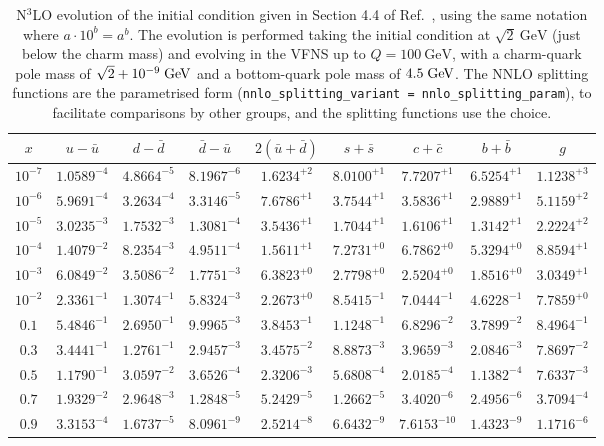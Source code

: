 \begin{table}[p]
  \small \centering
  \begin{tabular}{c|cccccccc}
    $x$ &  $u-\bar u$ &$d-\bar d$ &$\bar d-\bar u$ &  $ 2(\bar u+\bar d)$  &$s+\bar s$&$c+\bar c$ &$b+\bar b$  &   $g$\\
    \toprule
$10^{-7}$ &  $1.0589^{-4}$ &  $4.8664^{-5}$ &  $8.1967^{-6}$ &  $1.6234^{+2}$ &  $8.0100^{+1}$ &  $7.7207^{+1}$ &  $6.5254^{+1}$ &  $1.1238^{+3}$ \\
$10^{-6}$ &  $5.9691^{-4}$ &  $3.2634^{-4}$ &  $3.3146^{-5}$ &  $7.6786^{+1}$ &  $3.7544^{+1}$ &  $3.5836^{+1}$ &  $2.9889^{+1}$ &  $5.1159^{+2}$ \\
$10^{-5}$ &  $3.0235^{-3}$ &  $1.7532^{-3}$ &  $1.3081^{-4}$ &  $3.5436^{+1}$ &  $1.7044^{+1}$ &  $1.6106^{+1}$ &  $1.3142^{+1}$ &  $2.2224^{+2}$ \\
$10^{-4}$ &  $1.4079^{-2}$ &  $8.2354^{-3}$ &  $4.9511^{-4}$ &  $1.5611^{+1}$ &  $7.2731^{+0}$ &  $6.7862^{+0}$ &  $5.3294^{+0}$ &  $8.8594^{+1}$ \\
$10^{-3}$ &  $6.0849^{-2}$ &  $3.5086^{-2}$ &  $1.7751^{-3}$ &  $6.3823^{+0}$ &  $2.7798^{+0}$ &  $2.5204^{+0}$ &  $1.8516^{+0}$ &  $3.0349^{+1}$ \\
$10^{-2}$ &  $2.3361^{-1}$ &  $1.3074^{-1}$ &  $5.8324^{-3}$ &  $2.2673^{+0}$ &  $8.5415^{-1}$ &  $7.0444^{-1}$ &  $4.6228^{-1}$ &  $7.7859^{+0}$ \\
$0.1$    &  $5.4846^{-1}$ &  $2.6950^{-1}$ &  $9.9965^{-3}$ &  $3.8453^{-1}$ &  $1.1248^{-1}$ &  $6.8296^{-2}$ &  $3.7899^{-2}$ &  $8.4964^{-1}$ \\
$0.3$    &  $3.4441^{-1}$ &  $1.2761^{-1}$ &  $2.9457^{-3}$ &  $3.4575^{-2}$ &  $8.8873^{-3}$ &  $3.9659^{-3}$ &  $2.0846^{-3}$ &  $7.8697^{-2}$ \\
$0.5$    &  $1.1790^{-1}$ &  $3.0597^{-2}$ &  $3.6526^{-4}$ &  $2.3206^{-3}$ &  $5.6808^{-4}$ &  $2.0185^{-4}$ &  $1.1382^{-4}$ &  $7.6337^{-3}$ \\
$0.7$    &  $1.9329^{-2}$ &  $2.9648^{-3}$ &  $1.2848^{-5}$ &  $5.2429^{-5}$ &  $1.2662^{-5}$ &  $3.4020^{-6}$ &  $2.4956^{-6}$ &  $3.7094^{-4}$ \\
$0.9$    &  $3.3153^{-4}$ &  $1.6737^{-5}$ &  $8.0961^{-9}$ &  $2.5214^{-8}$ &  $6.6432^{-9}$ &  $7.6153^{-10}$ &  $1.4323^{-9}$ &  $1.1716^{-6}$ 
  \end{tabular}
  \caption{N$^3$LO evolution of the initial condition given in Section
    4.4 of Ref.~\cite{Dittmar:2005ed}, using the same notation where
    $a\cdot10^{b} = a^b$. The evolution is performed taking the
    initial condition at $\sqrt{2}~\text{GeV}$ (just below the charm
    mass) and evolving in the VFNS up to $Q=100~\text{GeV}$, with a
    charm-quark pole mass of $\sqrt{2}+10^{-9}\;\mathrm{GeV}$ and a bottom-quark
    pole mass of $4.5\;\mathrm{GeV}$.
    The NNLO splitting functions are the parametrised form
    (\texttt{nnlo\_splitting\_variant = nnlo\_splitting\_param}), to 
    facilitate comparisons by other groups, and the \ntlo splitting
    functions use the
     choice.}
  \label{tab:n3lo-evolve}
\end{table}


